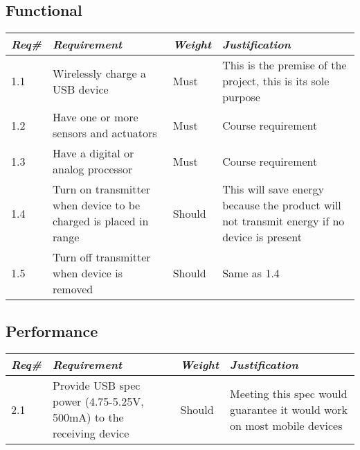     \subsection{Functional}
        \begin{centering}
        \begin{tabular}{|l|m{7cm}|l|m{7cm}|} \hline
        \textit{\textbf{Req\#}}	& \textit{\textbf{Requirement}} &\textit{\textbf{Weight}}&\textit{\textbf{Justification}} \\ \hline
        1.1	& Wirelessly charge a USB device & Must	& This is the premise of the project, this is its sole purpose \\ \hline
        1.2	& Have one or more sensors and actuators & Must	& Course requirement \\ \hline
        1.3	& Have a digital or analog processor & Must	& Course requirement \\ \hline
        1.4	& Turn on transmitter when device to be charged is placed in range	& Should & This will save energy because the product will not transmit energy if no device is present \\ \hline
        1.5 & Turn off transmitter when device is removed	& Should & Same as 1.4 \\ \hline
        \end{tabular}
        \end{centering}
        
    \subsection{Performance}
        \begin{centering}
        \begin{tabular}{|l|m{7cm}|l|m{7cm}|} \hline
        \textit{\textbf{Req\#}}	& \textit{\textbf{Requirement}} &\textit{\textbf{Weight}}&\textit{\textbf{Justification}} \\ \hline
        2.1	& Provide USB spec power (4.75-5.25V, 500mA) \cite{USB20}to the receiving device& Should & Meeting this spec would guarantee it would work on most mobile devices \\ \hline
        \end{tabular}
        \end{centering}
    
\newpage
{}  %

